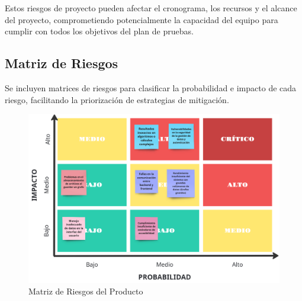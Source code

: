 \documentclass[stu, 12pt, letterpaper, donotrepeattitle, floatsintext, natbib]{apa7}
\begin{document}
\noindent Estos riesgos de proyecto pueden afectar el cronograma, los recursos y el alcance del proyecto, comprometiendo potencialmente la capacidad del equipo para cumplir con todos los objetivos del plan de pruebas.

\subsection{Matriz de Riesgos}

\noindent Se incluyen matrices de riesgos para clasificar la probabilidad e impacto de cada riesgo, facilitando la priorización de estrategias de mitigación.

\begin{figure}[H]
    \centering
    \caption{Matriz de Riesgos del Producto}
    \label{fig:product_risk_matrix}
    \includegraphics[width=\textwidth]{../imgs/matrix_producto.png}
\end{figure}
\end{document}
